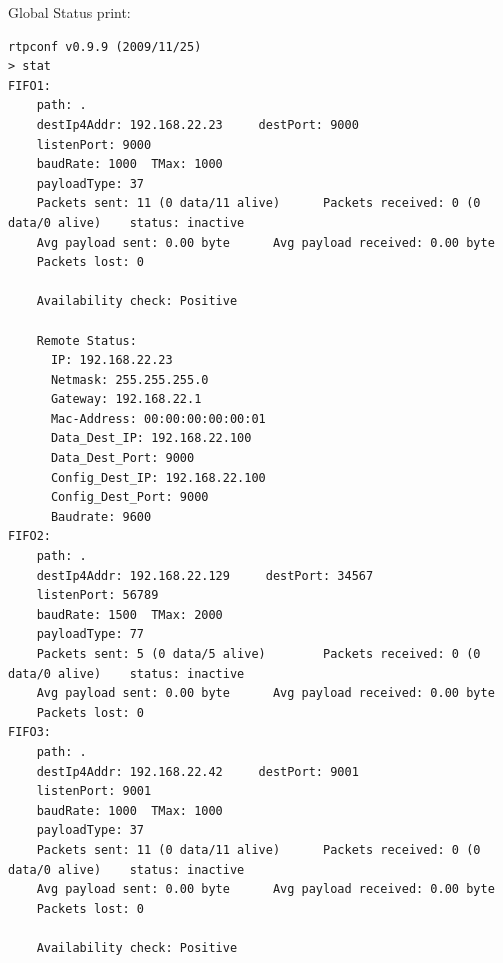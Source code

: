 \documentclass[a4paper]{book}%
\begin{document}
Global Status print:

\begin{verbatim}
rtpconf v0.9.9 (2009/11/25)
> stat
FIFO1:                                                  
	path: .                               
	destIp4Addr: 192.168.22.23     destPort: 9000  
	listenPort: 9000                               
	baudRate: 1000  TMax: 1000                      
	payloadType: 37                                 
	Packets sent: 11 (0 data/11 alive)      Packets received: 0 (0 data/0 alive)    status: inactive
	Avg payload sent: 0.00 byte      Avg payload received: 0.00 byte                                
	Packets lost: 0                                                                                 

	Availability check: Positive

	Remote Status:
	  IP: 192.168.22.23
	  Netmask: 255.255.255.0
	  Gateway: 192.168.22.1
	  Mac-Address: 00:00:00:00:00:01
	  Data_Dest_IP: 192.168.22.100
	  Data_Dest_Port: 9000
	  Config_Dest_IP: 192.168.22.100
	  Config_Dest_Port: 9000
	  Baudrate: 9600
FIFO2:                                                                                                  
	path: .                                                                                         
	destIp4Addr: 192.168.22.129     destPort: 34567                                                 
	listenPort: 56789                                                                               
	baudRate: 1500  TMax: 2000                                                                      
	payloadType: 77                                                                                 
	Packets sent: 5 (0 data/5 alive)        Packets received: 0 (0 data/0 alive)    status: inactive
	Avg payload sent: 0.00 byte      Avg payload received: 0.00 byte                                
	Packets lost: 0
FIFO3:                                                  
	path: .                               
	destIp4Addr: 192.168.22.42     destPort: 9001  
	listenPort: 9001                               
	baudRate: 1000  TMax: 1000                      
	payloadType: 37                                 
	Packets sent: 11 (0 data/11 alive)      Packets received: 0 (0 data/0 alive)    status: inactive
	Avg payload sent: 0.00 byte      Avg payload received: 0.00 byte                                
	Packets lost: 0                                                                                 

	Availability check: Positive


\end{verbatim}
\end{document}
